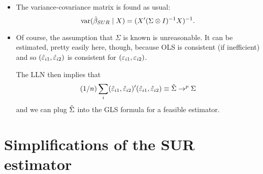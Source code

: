 \begin{itemize}[leftmargin=0pt]
\item The variance-covariance matrix is found as usual:
  \begin{equation*}
    \operatorname{var}(\hat{\beta}_{SUR} \mid X) = (X'(\Sigma \otimes I)^{-1}X)^{-1}.
  \end{equation*}

\item Of course, the assumption that $\Sigma$ is known is
  unreasonable. It can be estimated, pretty easily here, though,
  because OLS is consistent (if inefficient) and so $(\hat{\varepsilon}_{i1},
  \hat{\varepsilon}_{i2})$ is consistent for $(\varepsilon_{i1}, \varepsilon_{i2})$.

  The LLN then implies that
  \begin{equation*}
    (1/n) \sum_i (\hat{\varepsilon}_{i1}, \hat{\varepsilon}_{i2})' (\hat{\varepsilon}_{i1}, \hat{\varepsilon}_{i2})
    \equiv \hat{\Sigma} \to^p \Sigma
  \end{equation*}
  and we can plug $\hat{\Sigma}$ into the GLS formula for a feasible
  estimator.

\end{itemize}

\section{Simplifications of the SUR estimator}


